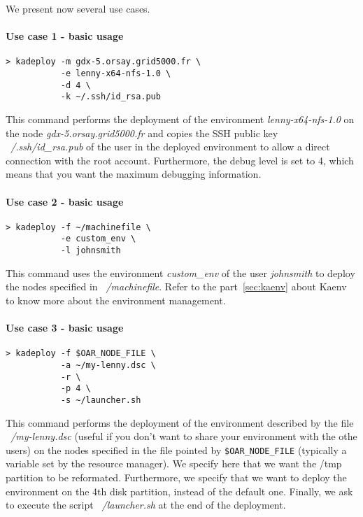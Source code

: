 \documentclass[a4wide,10pt,oneside]{book}
\begin{document}
We present now several use cases.

\paragraph{Use case 1 - basic usage}
\begin{verbatim}
> kadeploy -m gdx-5.orsay.grid5000.fr \
           -e lenny-x64-nfs-1.0 \
           -d 4 \
           -k ~/.ssh/id_rsa.pub
\end{verbatim}
This command performs the deployment of the environment \textit{lenny-x64-nfs-1.0} on the node \textit{gdx-5.orsay.grid5000.fr} and copies the SSH public key \textit{~/.ssh/id\_rsa.pub} of the user in the deployed environment to allow a direct connection with the root account. Furthermore, the debug level is set to 4, which means that you want the maximum debugging information.

\paragraph{Use case 2 - basic usage}
\begin{verbatim}
> kadeploy -f ~/machinefile \
           -e custom_env \
           -l johnsmith
\end{verbatim}
This command uses the environment \textit{custom\_env} of the user \textit{johnsmith} to deploy the nodes specified in \textit{~/machinefile}. Refer to the part~\ref{sec:kaenv} about Kaenv to know more about the environment management.

\paragraph{Use case 3 - basic usage}
\begin{verbatim}
> kadeploy -f $OAR_NODE_FILE \
           -a ~/my-lenny.dsc \
           -r \
           -p 4 \
           -s ~/launcher.sh
\end{verbatim}
This command performs the deployment of the environment described by the file \textit{~/my-lenny.dsc} (useful if you don't want to share your environment with the othe users) on the nodes specified in the file pointed by \texttt{\$OAR\_NODE\_FILE} (typically a variable set by the resource manager). We specify here that we want the /tmp partition to be reformated. Furthermore, we specify that we want to deploy the environment on the 4th disk partition, instead of the default one. Finally, we ask to execute the script \textit{~/launcher.sh} at the end of the deployment.
\end{document}
